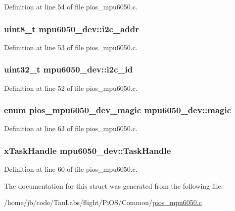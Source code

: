 \-Definition at line 54 of file pios\-\_\-mpu6050.\-c.

\hypertarget{structmpu6050__dev_a62f37e4827ac7856727a18e7cc6a252d}{
\subsubsection[{i2c\-\_\-addr}]{\setlength{\rightskip}{0pt plus 5cm}uint8\-\_\-t {\bf mpu6050\-\_\-dev\-::i2c\-\_\-addr}}}\label{structmpu6050__dev_a62f37e4827ac7856727a18e7cc6a252d}


\-Definition at line 53 of file pios\-\_\-mpu6050.\-c.

\hypertarget{structmpu6050__dev_ac0c61d2a2005659c182ca98984b49dd1}{
\subsubsection[{i2c\-\_\-id}]{\setlength{\rightskip}{0pt plus 5cm}uint32\-\_\-t {\bf mpu6050\-\_\-dev\-::i2c\-\_\-id}}}\label{structmpu6050__dev_ac0c61d2a2005659c182ca98984b49dd1}


\-Definition at line 52 of file pios\-\_\-mpu6050.\-c.

\hypertarget{structmpu6050__dev_acc91a02bd2c3ea3808aa09d4358d56ea}{
\subsubsection[{magic}]{\setlength{\rightskip}{0pt plus 5cm}enum {\bf pios\-\_\-mpu6050\-\_\-dev\-\_\-magic} {\bf mpu6050\-\_\-dev\-::magic}}}\label{structmpu6050__dev_acc91a02bd2c3ea3808aa09d4358d56ea}


\-Definition at line 63 of file pios\-\_\-mpu6050.\-c.

\hypertarget{structmpu6050__dev_ae7f409a90546c5e2c100212a0bd63d94}{
\subsubsection[{\-Task\-Handle}]{\setlength{\rightskip}{0pt plus 5cm}x\-Task\-Handle {\bf mpu6050\-\_\-dev\-::\-Task\-Handle}}}\label{structmpu6050__dev_ae7f409a90546c5e2c100212a0bd63d94}


\-Definition at line 60 of file pios\-\_\-mpu6050.\-c.



\-The documentation for this struct was generated from the following file\-:\begin{DoxyCompactItemize}
\item 
/home/jb/code/\-Tau\-Labs/flight/\-Pi\-O\-S/\-Common/\hyperlink{pios__mpu6050_8c}{pios\-\_\-mpu6050.\-c}\end{DoxyCompactItemize}

